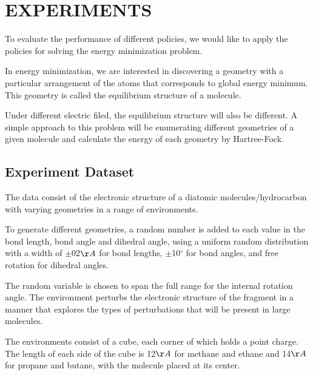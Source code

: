 \documentclass[twoside]{article}
\begin{document}
\section{EXPERIMENTS}

To evaluate the performance of different policies, we would like to apply the policies for solving the energy minimization problem.

In energy minimization, we are interested in discovering a geometry with a particular arrangement of the atoms that corresponds to global energy minimum. This geometry is called the equilibrium structure of a molecule.

Under different electric filed, the equilibrium structure will also be different. A simple approach to this problem will be enumerating different geometries of a given molecule and calculate the energy of each geometry by Hartree-Fock. 

 
\subsection{Experiment Dataset}

The data consist of the electronic structure of a diatomic molecules/hydrocarbon with varying geometries in a range of environments. 

To generate different geometries,
a random number is added to each value in the bond length, bond angle and dihedral angle, using a uniform random distribution with a width of $\pm$02$\AA$ for bond lengths,  $\pm$10$^{\circ}$ for bond angles, and free rotation for dihedral angles. 

The random variable is chosen to span the full range for the internal rotation angle. The environment perturbs the electronic structure of the fragment in a manner that explores the types of perturbations that will be present in large molecules. 


The environments consist of a cube, each corner of which holds a point charge. The length of each side of the cube is 12$\AA$  for methane and ethane and 14$\AA$  for propane and butane, with the molecule placed at its center. 

\end{document}
